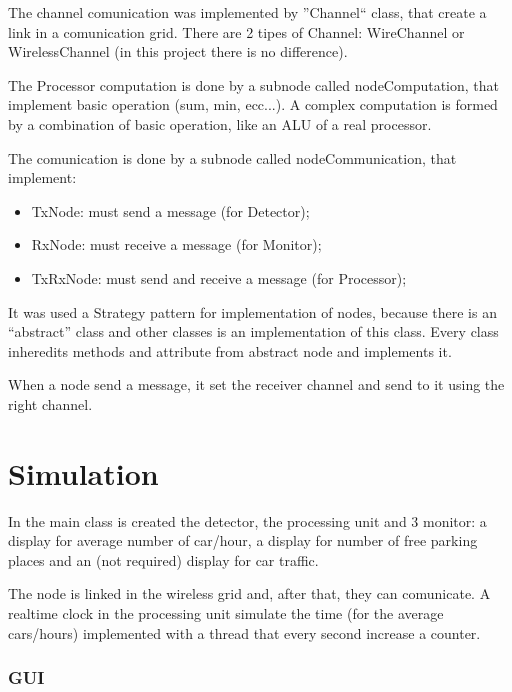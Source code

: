 \documentclass[a4paper,titlepage]{article}
\begin{document}
The channel comunication was implemented by ''Channel`` class, that create a link in a comunication grid. There are 2 tipes of Channel: WireChannel or WirelessChannel (in this project there is no difference).

The Processor computation is done by a subnode called nodeComputation, that implement basic operation (sum, min, ecc...). A complex computation is formed by a combination of basic operation, like an ALU of a real processor.

The comunication is done by a subnode called nodeCommunication, that implement:

\begin{itemize}[noitemsep,topsep=20pt,parsep=10pt,partopsep=20pt]

\item TxNode: must send a message (for Detector);

\item RxNode: must receive a message (for Monitor);

\item TxRxNode: must send and receive a message (for Processor);

\end{itemize}

It was used a Strategy pattern for implementation of nodes, because there is an ``abstract'' class and other classes is an implementation of this class. Every class inheredits methods and attribute from abstract node and implements it. 

When a node send a message, it set the receiver channel and send to it using the right channel.

\newpage
\part{Simulation}

In the main class is created the detector, the processing unit and 3 monitor: a display for average number of car/hour, a display for number of free parking places and an (not required) display for car traffic.

The node is linked in the wireless grid and, after that, they can comunicate. A realtime clock in the processing unit simulate the time (for the average cars/hours) implemented with a thread that every second increase a counter. 

\section*{GUI}
\end{document}
